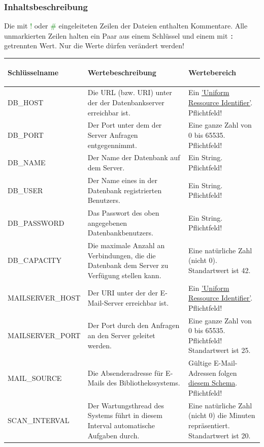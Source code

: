 \documentclass{article}
\begin{document}
\subsubsection{Inhaltsbeschreibung}
\hypertarget{propSchema}{}
Die mit \textcolor{green}{!} oder \textcolor{green}{\#} eingeleiteten Zeilen der Dateien enthalten Kommentare. Alle unmarkierten Zeilen halten ein Paar aus einem Schlüssel und einem mit \texttt{:} getrennten Wert. Nur die Werte dürfen verändert werden! 

\begin{center}
\begin{table}[H]
\begin{tabular} {| m{4cm} | m{6cm} | m{5cm} |}
\hline
\hypertarget{configTabelle}{Schlüsselname} & Wertebeschreibung & Wertebereich \\
\hline
DB\_HOST & Die URL (bzw. URI) unter der der Datenbankserver erreichbar ist.& Ein \hyperlink{https://datatracker.ietf.org/doc/html/rfc3986}{'Uniform Ressource Identifier'}. Pflichtfeld!\\
\hline
DB\_PORT & Der Port unter dem der Server Anfragen entgegennimmt. & Eine ganze Zahl von 0 bis 65535. Pflichtfeld!\\
\hline
DB\_NAME & Der Name der Datenbank auf dem Server. & Ein String. Pflichtfeld!\\
\hline
DB\_USER & Der Name eines in der Datenbank registrierten Benutzers. & Ein String. Pflichtfeld!\\
\hline
DB\_PASSWORD & Das Passwort des oben angegebenen Datenbankbenutzers. & Ein String. Pflichtfeld!\\
\hline
DB\_CAPACITY & Die maximale Anzahl an Verbindungen, die die Datenbank dem Server zu Verfügung stellen kann. & Eine natürliche Zahl (nicht 0). Standartwert ist 42.\\
\hline
MAILSERVER\_HOST & Der URI unter der der E-Mail-Server erreichbar ist. &  Ein \hyperlink{https://datatracker.ietf.org/doc/html/rfc3986}{'Uniform Ressource Identifier'}. Pflichtfeld! \\ 
\hline
MAILSERVER\_PORT & Der Port durch den Anfragen an den Server geleitet werden. & Eine ganze Zahl von 0 bis 65535. Pflichtfeld! Standartwert ist 25. \\
\hline
MAIL\_SOURCE & Die Absenderadresse für E-Mails des Bibliothekssystems. & Gültige E-Mail-Adressen folgen \hyperlink{https://datatracker.ietf.org/doc/html/rfc5322}{diesem Schema}. Pflichtfeld!\\
\hline
SCAN\_INTERVAL & Der Wartungsthread des Systems führt in diesem Interval automatische Aufgaben durch. & Eine natürliche Zahl (nicht 0) die Minuten repräsentiert. Standartwert ist 20. \\

\end{tabular}
\end{table}
\end{center}
\end{document}
